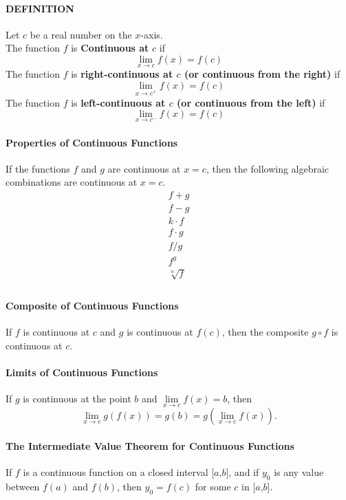 \documentclass{article}
\begin{document}
                \paragraph{DEFINITION} Let $c$ be a real number on the $x$-axis.\\
                The function $f$ is \textbf{Continuous at} $c$ if 
                \[\lim\limits_{x\to c}f(x)=f(c)\]
                The function $f$ is \textbf{right-continuous at $c$ (or continuous from the right)} if
                \[\lim\limits_{x\to c^+}f(x)=f(c)\]
                The function $f$ is \textbf{left-continuous at $c$ (or continuous from the left)} if
                \[\lim\limits_{x\to c^-}f(x)=f(c)\]
                \paragraph{Properties of Continuous Functions} If the functions $f$ and $g$ are continuous at $x=c$, then the following algebraic combinations are continuous at $x=c$.
                \begin{equation}
                    \begin{aligned}
                        f+g\\
                        f-g\\
                        k\cdot f\\
                        f\cdot g\\
                        f/g\\
                        f^g\\
                        \sqrt[n]{f}\\
                    \end{aligned}
                \end{equation}
                \paragraph{Composite of Continuous Functions} If $f$ is continuous at $c$ and $g$ is continuous at $f(c)$, then the composite $g\circ f$ is continuous at $c$.
                \paragraph{Limits of Continuous Functions} If $g$ is continuous at the point $b$ and $\lim\limits_{x\to c}f(x)=b$, then 
                \[\lim\limits_{x\to c}g(f(x))=g(b)=g(\lim\limits_{x\to c}f(x)).\]
                \paragraph{The Intermediate Value Theorem for Continuous Functions} If $f$ is a continuous function on a closed interval [$a$,$b$], and if $y_0$ is any value between $f(a)$ and $f(b)$, then $y_0=f(c)$ for some $c$ in [$a$,$b$].
\end{document}
